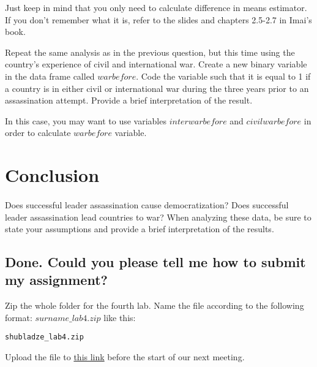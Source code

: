 \documentclass{article}\usepackage[]{graphicx}\usepackage[]{color}
\makeatletter
\newcommand{\hlstd}[1]{\textcolor[rgb]{0.345,0.345,0.345}{#1}}%
\newenvironment{kframe}{%
 \def\at@end@of@kframe{}%
 \ifinner\ifhmode%
  \def\at@end@of@kframe{\end{minipage}}%
  \begin{minipage}{\columnwidth}%
 \fi\fi%
 \def\FrameCommand##1{\hskip\@totalleftmargin \hskip-\fboxsep
 \colorbox{shadecolor}{##1}\hskip-\fboxsep
     \hskip-\linewidth \hskip-\@totalleftmargin \hskip\columnwidth}%
 \MakeFramed {\advance\hsize-\width
   \@totalleftmargin\z@ \linewidth\hsize
   \@setminipage}}%
 {\par\unskip\endMakeFramed%
 \at@end@of@kframe}
\newenvironment{knitrout}{}{} %
\makeatother
\begin{document}
Just keep in mind that you only need to calculate difference in means estimator. If you don't remember what it is, refer to the slides and chapters 2.5-2.7 in Imai's book.

Repeat the same analysis as in the previous question, but this time using the country’s experience of civil and international war. Create a new binary variable in the data frame called $warbefore$. Code the variable such that it is equal to 1 if a country is in either civil or international war during the three years prior to an assassination attempt. Provide a brief interpretation of the result.

In this case, you may want to use variables $interwarbefore$ and $civilwarbefore$ in order to calculate $warbefore$ variable. 

\section*{Conclusion}
\paragraph{}

Does successful leader assassination cause democratization? Does successful leader assassination lead countries to war? When analyzing these data, be sure to state your assumptions and provide a brief interpretation of the results.

\subsection*{Done. Could you please tell me how to submit my assignment?}

Zip the whole folder for the fourth lab. Name the file according to the following format: $surname\_lab4.zip$ like this:

\begin{knitrout}
\color{fgcolor}\begin{kframe}
\begin{alltt}
\hlstd{shubladze_lab4.zip}
\end{alltt}
\end{kframe}
\end{knitrout}

Upload the file to \href{https://www.dropbox.com/request/6uV9hJ3jvKsMdUM7gnKj}{this link} before the start of our next meeting.
\end{document}
